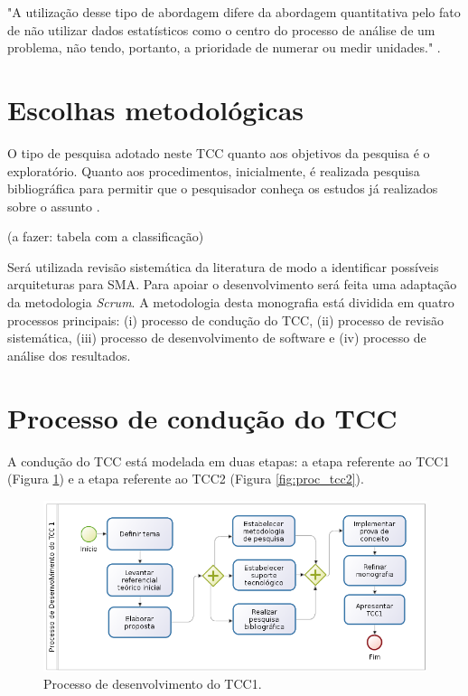 \begin{citacao}
"A utilização desse tipo de abordagem difere da abordagem quantitativa pelo fato de não utilizar dados estatísticos como o centro do processo de análise de um problema, não tendo, portanto, a prioridade de numerar ou medir unidades." \cite{prodanov2013}.
\end{citacao}



\section{Escolhas metodológicas}


O tipo de pesquisa adotado neste TCC  quanto aos objetivos da pesquisa é o exploratório. Quanto aos procedimentos, inicialmente, é realizada pesquisa bibliográfica para permitir que o pesquisador conheça os estudos já realizados sobre o assunto \cite[pág. 31]{fonseca}. 

(a fazer: tabela com a classificação)

Será utilizada revisão sistemática da literatura de modo a identificar possíveis arquiteturas para SMA. Para apoiar o desenvolvimento será feita uma adaptação da metodologia \textit{Scrum}. A metodologia desta monografia está dividida em quatro processos principais: (i) processo de condução do TCC, (ii) processo de revisão sistemática, (iii) processo de desenvolvimento de software e (iv) processo de análise dos resultados.



\section{Processo de condução do TCC}

A condução do TCC está modelada em duas etapas: a etapa referente ao TCC1 (Figura \ref{fig:proc_tcc1}) e a etapa referente ao TCC2 (Figura \ref{fig:proc_tcc2}).

\begin{figure}[!htb]
\centering
\includegraphics[scale=0.6]{figuras/processo_tcc1}
\caption{Processo de desenvolvimento do TCC1.}
\label{fig:proc_tcc1}
\end{figure}

